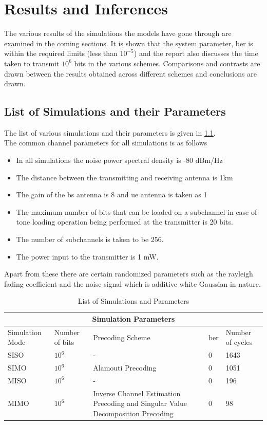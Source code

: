 \chapter{Results and Inferences}

The various results of the simulations the models have gone through are examined in the coming sections. It is shown that the system parameter, \acrshort{ber} is within the required limits (less than $10^{-5}$) and the report also discusses the time taken to transmit $10^6$ bits in the various schemes. Comparisons and contrasts are drawn between the results obtained across different schemes and conclusions are drawn.

\section{List of Simulations and their Parameters}
The list of various simulations and their parameters is given in \ref{List of Simulations and their Parameters}.\\

The common channel parameters for all simulations is as follows
\begin{itemize}
\item In all simulations the noise power spectral density is -80 dBm/Hz
\item The distance between the transmitting and receiving antenna is 1km
\item The gain of the \acrshort{bs} antenna is 8 and \acrshort{ue} antenna is taken as 1
\item The maximum number of bits that can be loaded on a subchannel in case of tone loading operation being performed at the transmitter is 20 bits.
\item The number of subchannels is taken to be 256.
\item The power input to the transmitter is 1 mW.
\end{itemize}

Apart from these there are certain randomized parameters such as the \gls{rayleigh fading} coefficient and the noise signal which is additive white Gaussian in nature.

\begin{table}[htpb]
\centering
\label{List of Simulations and their Parameters}
\caption{List of Simulations and Parameters}
\begin{tabular}{ |p{3cm}||p{3cm}|p{3cm}|p{3cm}| |p{3cm}|}
 \hline
 \multicolumn{5}{|c|}{Simulation Parameters} \\
 \hline
 Simulation Mode & Number of bits & Precoding Scheme & \acrshort{ber} & Number of cycles\\
 \hline
 SISO & $10^6$    & - &   0 & 1643\\
 SIMO & $10^6$    & Alamouti Precoding &   0 & 1051\\
 MISO & $10^6$    & - &   0 & 196\\
 MIMO & $10^6$    & Inverse Channel Estimation Precoding and Singular Value Decomposition Precoding &   0 & 98\\
 \hline
\end{tabular}
\end{table}

